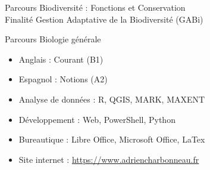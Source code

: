 \documentclass[10pt,a4paper,ragged2e,withhyper]{altacv}
\begin{document}
\begin{paracol}{2}
Parcours Biodiversité : Fonctions et Conservation\\
Finalité Gestion Adaptative de la Biodiversité (GABi)

\divider

Parcours Biologie générale


\begin{itemize}
\item Anglais : Courant (B1)
\item Espagnol : Notions (A2)
\end{itemize}

\divider

\begin{itemize}
\item Analyse de données : R, QGIS, MARK, MAXENT
\item Développement : Web, PowerShell, Python
\item Bureautique : Libre Office, Microsoft Office, LaTex
\item Site internet : \url{https://www.adriencharbonneau.fr}
\end{itemize}







\\
{}
\\
\\

\end{paracol}
\end{document}
